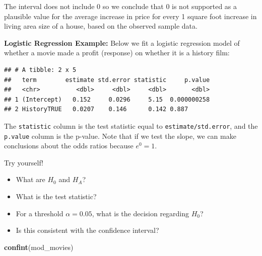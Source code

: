 \documentclass[
]{book}
\newenvironment{Shaded}{\begin{snugshade}}{\end{snugshade}}
\newcommand{\DataTypeTok}[1]{\textcolor[rgb]{0.13,0.29,0.53}{#1}}
\newcommand{\KeywordTok}[1]{\textcolor[rgb]{0.13,0.29,0.53}{\textbf{#1}}}
\newcommand{\NormalTok}[1]{#1}
\newcommand{\OperatorTok}[1]{\textcolor[rgb]{0.81,0.36,0.00}{\textbf{#1}}}
\newcommand{\StringTok}[1]{\textcolor[rgb]{0.31,0.60,0.02}{#1}}
\providecommand{\tightlist}{%
  \setlength{\itemsep}{0pt}\setlength{\parskip}{0pt}}
\begin{document}
The interval does not include 0 so we conclude that 0 is not supported as a plausible value for the average increase in price for every 1 square foot increase in living area size of a house, based on the observed sample data.

\textbf{Logistic Regression Example:} Below we fit a logistic regression model of whether a movie made a profit (response) on whether it is a history film:

\begin{Shaded}
\end{Shaded}

\begin{verbatim}
## # A tibble: 2 x 5
##   term        estimate std.error statistic     p.value
##   <chr>          <dbl>     <dbl>     <dbl>       <dbl>
## 1 (Intercept)   0.152     0.0296     5.15  0.000000258
## 2 HistoryTRUE   0.0207    0.146      0.142 0.887
\end{verbatim}

The \texttt{statistic} column is the test statistic equal to \texttt{estimate/std.error}, and the \texttt{p.value} column is the p-value. Note that if we test the slope, we can make conclusions about the odds ratios because \(e^0 = 1\).

Try yourself!

\begin{itemize}
\tightlist
\item
  What are \(H_0\) and \(H_A\)?
\item
  What is the test statistic?
\item
  For a threshold \(\alpha = 0.05\), what is the decision regarding \(H_0\)?
\item
  Is this consistent with the confidence interval?
\end{itemize}

\begin{Shaded}
\begin{Highlighting}[]
\KeywordTok{confint}\NormalTok{(mod_movies)}
\end{Highlighting}
\end{Shaded}
\end{document}
